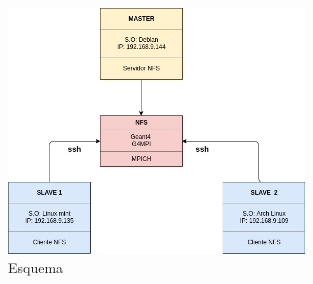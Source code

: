 \begin{figure}[H]
    \centering
  \includegraphics[width=0.7\textwidth]{images/EsquemaGeneral.jpg}
  \caption{Esquema}
  \label{esq}
\end{figure}


\newpage